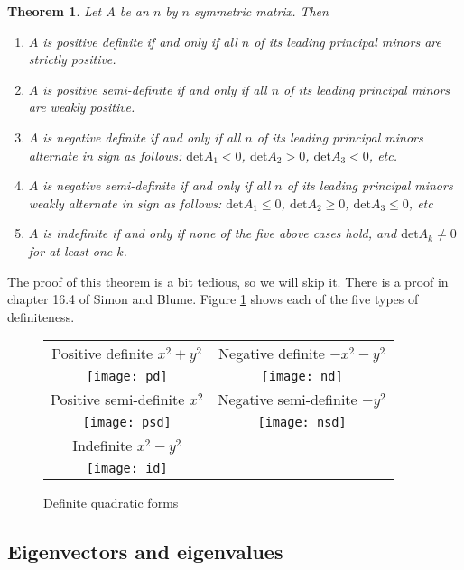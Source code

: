 \documentclass[12pt,reqno]{amsart}
\newtheorem{theorem}{Theorem}[section]
\theoremstyle{definition}
\renewcommand{\det}{\mathrm{det}}
\begin{document}
\begin{theorem}
  Let $A$ be an $n$ by $n$ symmetric matrix. Then 
  \begin{enumerate}
  \item $A$ is positive definite if and only if all $n$ of its leading
    principal minors are strictly positive.
  \item $A$ is positive semi-definite if and only if all $n$ of its leading
    principal minors are weakly positive.
  \item $A$ is negative definite if and only if all $n$ of its leading
    principal minors alternate in sign as follows: $\det A_1 < 0$,
    $\det A_2 > 0$, $\det A_3 < 0$, etc.
  \item $A$ is negative semi-definite if and only if all $n$ of its
    leading principal minors weakly alternate in sign as follows:
    $\det A_1 \leq 0$, $\det A_2 \geq 0$, $\det A_3 \leq 0$, etc
  \item $A$ is indefinite if and only if none of the five above cases
    hold, and $\det A_k \neq 0$ for at least one $k$.
  \end{enumerate}
\end{theorem}
The proof of this theorem is a bit tedious, so we will skip it. There
is a proof in chapter 16.4 of Simon and Blume. Figure
\ref{f:def} shows each of the five types of definiteness.

\begin{figure}\caption{Definite quadratic forms \label{f:def}}
  \begin{tabular}{cc} 
    {Positive definite} $x^2+y^2$ &  {Negative definite}
    $-x^2-y^2$ \\
    \texttt{[image: pd]} &
    \texttt{[image: nd]}
    \\
    {Positive semi-definite} $x^2$ &  {Negative
      semi-definite} $-y^2$
    \\ 
    \texttt{[image: psd]} &
    \texttt{[image: nsd]}   
    \\
    {Indefinite} $x^2 - y^2$ &  \\
    \texttt{[image: id]} & 
  \end{tabular}
\end{figure}

\subsection{Eigenvectors and eigenvalues}
\end{document}
